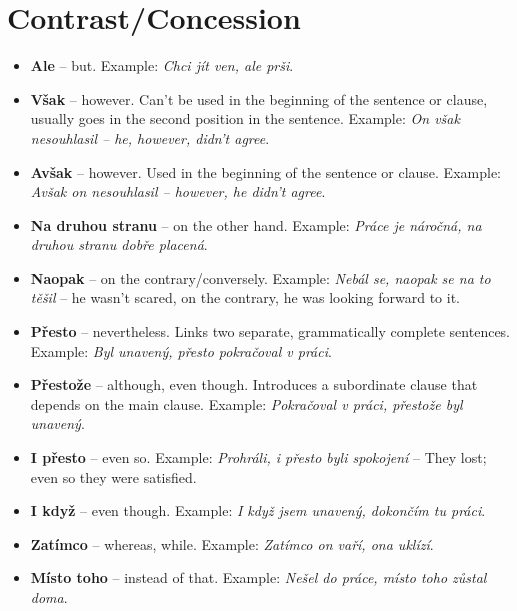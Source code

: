 \documentclass[12pt]{book}
\begin{document}
\section{Contrast/Concession}
\begin{itemize}
    \item \textbf{Ale} -- but. Example: \emph{Chci jít ven, ale prši}.
    \item \textbf{Však} -- however. Can't be used in the beginning of the sentence or clause, 
        usually goes in the second position in the sentence. Example: 
        \emph{On však nesouhlasil -- he, however, didn't agree}.

    \item \textbf{Avšak} -- however. Used in the beginning of the sentence or clause. Example:
        \emph{Avšak on nesouhlasil -- however, he didn't agree}.

    \item \textbf{Na druhou stranu} -- on the other hand. Example: 
        \emph{Práce je náročná, na druhou stranu dobře placená}.
    
    \item \textbf{Naopak} -- on the contrary/conversely. Example: \emph{Nebál se, naopak se na to těšil} --
        he wasn't scared, on the contrary, he was looking forward to it.

    \item \textbf{Přesto} -- nevertheless. Links two separate, grammatically complete sentences. Example:
        \emph{Byl unavený, přesto pokračoval v práci}.

    \item \textbf{Přestože} -- although, even though. Introduces a subordinate clause that depends on the 
        main clause. Example: \emph{Pokračoval v práci, přestože byl unavený}.

    \item \textbf{I přesto} -- even so. Example: \emph{Prohráli, i přesto byli spokojení} -- 
        They lost; even so they were satisfied.
    
    \item \textbf{I když} -- even though. Example: \emph{I když jsem unavený, dokončím tu práci}.
    \item \textbf{Zatímco} -- whereas, while. Example: \emph{Zatímco on vaří, ona uklízí}.
    \item \textbf{Místo toho} -- instead of that. Example: \emph{Nešel do práce, místo toho zůstal doma}.
\end{itemize}
\end{document}
